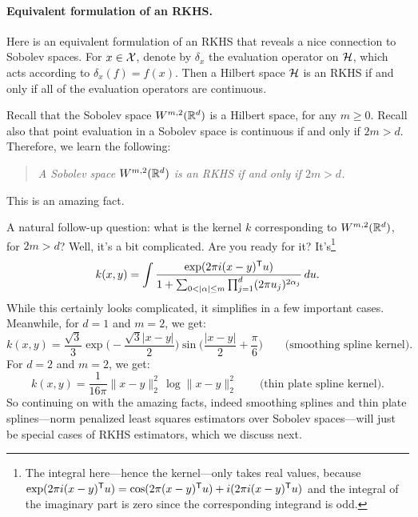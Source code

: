 \documentclass{article}
\begin{document}
\paragraph{Equivalent formulation of an RKHS.}

Here is an equivalent formulation of an RKHS that reveals a nice connection to
Sobolev spaces. For $x \in \mathcal{X}$, denote by $\delta_x$ the evaluation operator on
$\mathcal{H}$, which acts according to $\delta_x(f) = f(x)$. Then a Hilbert space $\mathcal{H}$
is an RKHS if and only if all of the evaluation operators are continuous. 

Recall that the Sobolev space $W^{m,2}(\mathbb{R}^d)$ is a Hilbert space, for any $m
\geq 0$. Recall also that point evaluation in a Sobolev space is continuous if
and only if $2m > d$. Therefore, we learn the following:     
\begin{quote}
\centering\it
A Sobolev space $W^{m,2}(\mathbb{R}^d)$ is an RKHS if and only if $2m > d$.
\end{quote}
This is an amazing fact. 

A natural follow-up question: what is the kernel $k$ corresponding to
$W^{m,2}(\mathbb{R}^d)$, for $2m > d$? Well, it's a bit complicated. Are you ready for
it? It's\footnote{The integral here---hence the kernel---only takes real values,
  because $\exp(2\pi i (x-y)^{\mathsf{T}} u) = \cos(2\pi(x-y)^{\mathsf{T}} u) + i (2\pi i (x-y)^{\mathsf{T}}
  u)$ and the integral of the imaginary part is zero since the corresponding
  integrand is odd.} 
\[
k(x,y) = \int \frac{\exp(2\pi i (x-y)^{\mathsf{T}} u)}{1 + \sum_{0 < |\alpha| \leq m}
  \prod_{j=1}^d (2\pi u_j)^{2\alpha_j}} \, du.
\]
While this certainly looks complicated, it simplifies in a few important cases.  
Meanwhile, for $d=1$ and $m=2$, we get:
\begin{equation}
\label{eq:ss_rkhs}
k(x,y) = \frac{\sqrt{3}}{3} \exp\bigg( -\frac{\sqrt{3}|x-y|}{2} \bigg) 
\sin\bigg( \frac{|x-y|}{2} + \frac{\pi}{6} \bigg) 
\qquad \text{(smoothing spline kernel)}.   
\end{equation}
For $d=2$ and $m=2$, we get: 
\begin{equation}
\label{eq:tp_rkhs}
k(x,y) = \frac{1}{16 \pi} \|x-y\|_2^2 \, \log \|x-y\|_2^2 
\qquad \text{(thin plate spline kernel)}.   
\end{equation}
So continuing on with the amazing facts, indeed smoothing splines and thin plate
splines---norm penalized least squares estimators over Sobolev spaces---will
just be special cases of RKHS estimators, which we discuss next.
\end{document}
